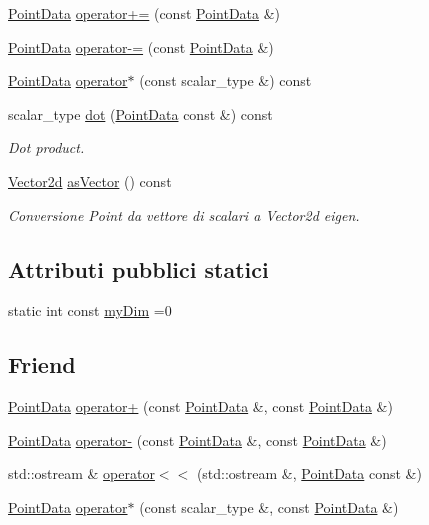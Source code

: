 \begin{DoxyCompactItemize}
\hyperlink{classPointData}{Point\-Data} \hyperlink{classPointData_a2a1e7d5a276c675e92c4cb4daad1c6c3}{operator+=} (const \hyperlink{classPointData}{Point\-Data} \&)
\item 
\hyperlink{classPointData}{Point\-Data} \hyperlink{classPointData_ac96b0706201f8fa9d47a11b8ca41f50f}{operator-\/=} (const \hyperlink{classPointData}{Point\-Data} \&)
\item 
\hyperlink{classPointData}{Point\-Data} \hyperlink{classPointData_ad19da242c16ae018a91b058dd1f71c5c}{operator$\ast$} (const scalar\-\_\-type \&) const 
\item 
scalar\-\_\-type \hyperlink{classPointData_aaa93107dbb5690747c82fccf45a13d6b}{dot} (\hyperlink{classPointData}{Point\-Data} const \&) const 
\begin{DoxyCompactList}\small\item\em Dot product. \end{DoxyCompactList}\item 
\hyperlink{Core_8h_a09205951ae66bf900cc5cc57e2192667}{Vector2d} \hyperlink{classPointData_a262fed95726ae252592717fe3cf2f9dd}{as\-Vector} () const 
\begin{DoxyCompactList}\small\item\em Conversione Point da vettore di scalari a Vector2d eigen. \end{DoxyCompactList}\end{DoxyCompactItemize}
\subsection*{Attributi pubblici statici}
\begin{DoxyCompactItemize}
\item 
static int const \hyperlink{classPointData_a71cd9807bc1c94983debb8bbe034916f}{my\-Dim} =0
\end{DoxyCompactItemize}
\subsection*{Friend}
\begin{DoxyCompactItemize}
\item 
\hyperlink{classPointData}{Point\-Data} \hyperlink{classPointData_ab370e3eb69ea46d1e823df7e5392af8f}{operator+} (const \hyperlink{classPointData}{Point\-Data} \&, const \hyperlink{classPointData}{Point\-Data} \&)
\item 
\hyperlink{classPointData}{Point\-Data} \hyperlink{classPointData_a6f2701482f365408126d5090cc25fa88}{operator-\/} (const \hyperlink{classPointData}{Point\-Data} \&, const \hyperlink{classPointData}{Point\-Data} \&)
\item 
std\-::ostream \& \hyperlink{classPointData_a38fd8a123c3c43359de04ddf1323f078}{operator$<$$<$} (std\-::ostream \&, \hyperlink{classPointData}{Point\-Data} const \&)
\item 
\hyperlink{classPointData}{Point\-Data} \hyperlink{classPointData_a4a177673740fbaa6db21b438c2b26357}{operator$\ast$} (const scalar\-\_\-type \&, const \hyperlink{classPointData}{Point\-Data} \&)
\end{DoxyCompactItemize}


